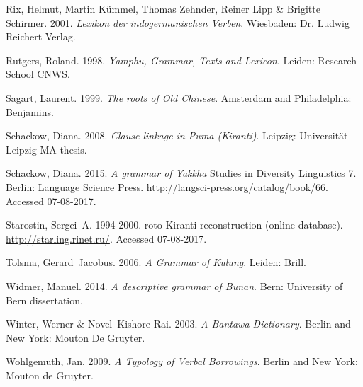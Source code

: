 \documentclass[oneside,a4paper,11pt]{article}
\begin{document}
\begin{thebibliography}{65}
Rix, Helmut, Martin Kümmel, Thomas Zehnder, Reiner Lipp \& Brigitte Schirmer.
  2001.
\newblock \emph{{L}exikon der indogermanischen {V}erben}.
\newblock Wiesbaden: Dr. Ludwig Reichert Verlag.

Rutgers, Roland. 1998.
\newblock \emph{{Y}amphu, {G}rammar, {T}exts and {L}exicon}.
\newblock Leiden: Research School CNWS.

Sagart, Laurent. 1999.
\newblock \emph{{T}he roots of {O}ld {C}hinese}.
\newblock Amsterdam and Philadelphia: Benjamins.

Schackow, Diana. 2008.
\newblock \emph{{C}lause linkage in {P}uma ({K}iranti)}.
\newblock Leipzig: Universität Leipzig MA thesis.

Schackow, Diana. 2015.
\newblock \emph{{A} grammar of {Y}akkha} Studies in Diversity Linguistics 7.
\newblock Berlin: Language Science Press.
\newblock \urlprefix\url{http://langsci-press.org/catalog/book/66}. Accessed 07-08-2017.

Starostin, Sergei~A. 1994-2000.
roto-{K}iranti reconstruction (online database).
\newblock \urlprefix\url{http://starling.rinet.ru/}. Accessed 07-08-2017.

Tolsma, Gerard~Jacobus. 2006.
\newblock \emph{{A} {G}rammar of {K}ulung}.
\newblock Leiden: Brill.

Widmer, Manuel. 2014.
\newblock \emph{{A} descriptive grammar of {B}unan}.
\newblock Bern: University of Bern dissertation.

Winter, Werner \& Novel~Kishore Rai. 2003.
\newblock \emph{{A} {B}antawa {D}ictionary}.
\newblock Berlin and New York: Mouton De Gruyter.

Wohlgemuth, Jan. 2009.
\newblock \emph{{A} {T}ypology of {V}erbal {B}orrowings}.
\newblock Berlin and New York: Mouton de Gruyter.

\end{thebibliography}
\end{document}
